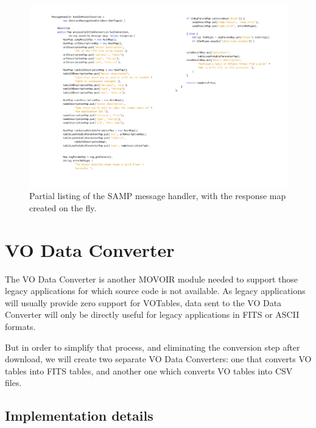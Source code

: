 			\begin{figure}[tbp]
				\centering
					\includegraphics[width=\textwidth]
					{fig/handleMovoirDescribe.pdf}
				\caption[
					Handler of the 
					message.
				]
				{
					Partial listing of the
					 SAMP message
					handler, with the response map created on the
					fly.
				}
				\label{fig:fig_handleMovoirDescribe}
			\end{figure}
			
			
			
	
	\section{VO Data Converter} %
	\label{sec:vo_data_converter}
		
		The VO Data Converter is another MOVOIR
		module needed to support those legacy applications for which
		source code is not available. As legacy applications
		will usually provide zero support for VOTables, data sent
		to the VO Data Converter will only be directly useful for
		legacy applications in FITS or ASCII formats.
		
		But in order to simplify that process, and eliminating
		the conversion step after download, we will create two
		separate VO Data Converters: one that converts VO tables
		into FITS tables, and another one which converts VO tables
		into CSV files.
		
		\subsection{Implementation details} %
		\label{sub:implementation_details_vodc}
		
